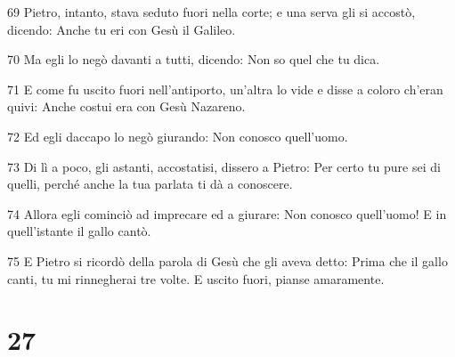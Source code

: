 \par 69 Pietro, intanto, stava seduto fuori nella corte; e una serva gli si accostò, dicendo: Anche tu eri con Gesù il Galileo.
\par 70 Ma egli lo negò davanti a tutti, dicendo: Non so quel che tu dica.
\par 71 E come fu uscito fuori nell'antiporto, un'altra lo vide e disse a coloro ch'eran quivi: Anche costui era con Gesù Nazareno.
\par 72 Ed egli daccapo lo negò giurando: Non conosco quell'uomo.
\par 73 Di lì a poco, gli astanti, accostatisi, dissero a Pietro: Per certo tu pure sei di quelli, perché anche la tua parlata ti dà a conoscere.
\par 74 Allora egli cominciò ad imprecare ed a giurare: Non conosco quell'uomo! E in quell'istante il gallo cantò.
\par 75 E Pietro si ricordò della parola di Gesù che gli aveva detto: Prima che il gallo canti, tu mi rinnegherai tre volte. E uscito fuori, pianse amaramente.

\chapter{27}

